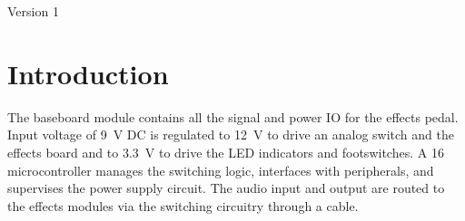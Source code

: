 \documentclass[12pt, titlepage]{/home/air/projects/latex-template/tex-template}
\begin{document}
\maketitle

\pagebreak
\tableofcontents
\pagebreak

\blankpage

\pagebreak
\begin{revisionhistory}
    Version 1
\end{revisionhistory}
\pagebreak

\blankpage

\pagebreak

\section{Introduction}
The baseboard module contains all the signal and power IO for the effects pedal. Input voltage of \SI{9}{\volt} DC is regulated to \SI{12}{\volt} to drive an analog switch and the effects board and to \SI{3.3}{\volt} to drive the LED indicators and footswitches. A \SI{16}{\bit} microcontroller manages the switching logic, interfaces with peripherals, and supervises the power supply circuit. The audio input and output are routed to the effects modules via the switching circuitry through a cable.
\end{document}
